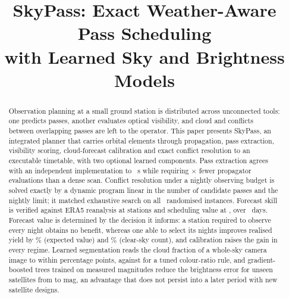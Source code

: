 \documentclass[conference]{IEEEtran}
\begin{document}
\title{SkyPass: Exact Weather-Aware Pass Scheduling\\with Learned Sky and Brightness Models}

\author{
\and
{}
}

\IEEEaftertitletext{\vspace{-1.2\baselineskip}}
\maketitle

\begin{abstract}
Observation planning at a small ground station is distributed across
unconnected tools: one predicts passes, another evaluates optical visibility,
and cloud and conflicts between overlapping passes are left to the operator.
This paper presents SkyPass, an integrated planner that carries orbital elements
through propagation, pass extraction, visibility scoring, cloud-forecast
calibration and exact conflict resolution to an executable timetable, with two
optional learned components. Pass extraction agrees with an independent
implementation to \SkyfieldTca~s while requiring \CallReduction$\times$ fewer
propagator evaluations than a dense scan. Conflict resolution under a nightly
observing budget is solved exactly by a dynamic program linear in the number of
candidate passes and the nightly limit; it matched exhaustive search on all
\SchedTrials~randomised instances. Forecast skill is verified against ERA5
reanalysis at \SkillStationsWord{} stations and scheduling value at
\EvalStationsWord{}, over \EvalDays~days. Forecast value is determined by the
decision it informs: a station required to observe every night obtains no
benefit, whereas one able to select its nights improves realised yield by
\BudgetGainEV\% (expected value) and \BudgetGainClear\% (clear-sky count), and
calibration raises the gain in every regime. Learned segmentation reads the
cloud fraction of a whole-sky camera image to within \CamGbmFrac{} percentage
points, against \CamTunedFrac{} for a tuned colour-ratio rule, and
gradient-boosted trees trained on \BrightObs{} measured magnitudes reduce the
brightness error for unseen satellites from \BrightMaeFitted{} to
\BrightMaeLearned{} mag, an advantage that does not persist into a later period
with new satellite designs.
\end{abstract}
\end{document}
